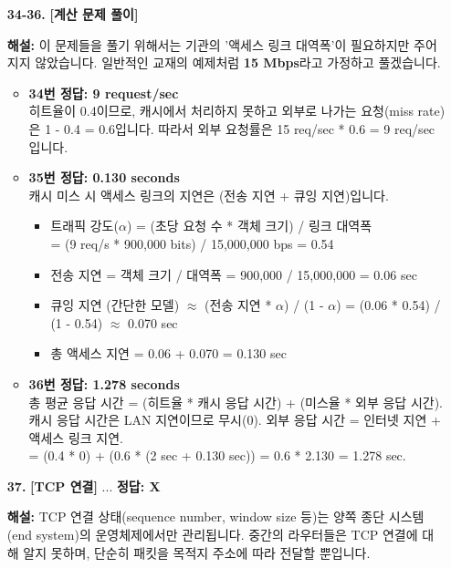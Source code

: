 \documentclass[a4paper, 10pt]{article}
\newcommand{\sectionbox}[1]{
  \vspace{0.5em}
  \noindent\fbox{\textbf{#1}}
  \vspace{0.5em}
}
\begin{document}
\begin{enumerate}[itemsep=2.5em, leftmargin=2em, label={}]
\item[\textbf{34-36.}] \textbf{[계산 문제 풀이]} \par
\small\textbf{해설:} 이 문제들을 풀기 위해서는 기관의 '액세스 링크 대역폭'이 필요하지만 주어지지 않았습니다. 일반적인 교재의 예제처럼 \textbf{15 Mbps}라고 가정하고 풀겠습니다.
\begin{itemize}
    \item \textbf{34번 정답: 9 request/sec} \\ 히트율이 0.4이므로, 캐시에서 처리하지 못하고 외부로 나가는 요청(miss rate)은 1 - 0.4 = 0.6입니다. 따라서 외부 요청률은 15 req/sec * 0.6 = 9 req/sec 입니다.
    \item \textbf{35번 정답: 0.130 seconds} \\ 캐시 미스 시 액세스 링크의 지연은 (전송 지연 + 큐잉 지연)입니다.
    \begin{itemize}
        \item 트래픽 강도($\alpha$) = (초당 요청 수 * 객체 크기) / 링크 대역폭 \\ = (9 req/s * 900,000 bits) / 15,000,000 bps = 0.54
        \item 전송 지연 = 객체 크기 / 대역폭 = 900,000 / 15,000,000 = 0.06 sec
        \item 큐잉 지연 (간단한 모델) $\approx$ (전송 지연 * $\alpha$) / (1 - $\alpha$) = (0.06 * 0.54) / (1 - 0.54) $\approx$ 0.070 sec
        \item 총 액세스 지연 = 0.06 + 0.070 = 0.130 sec
    \end{itemize}
    \item \textbf{36번 정답: 1.278 seconds} \\ 총 평균 응답 시간 = (히트율 * 캐시 응답 시간) + (미스율 * 외부 응답 시간). 캐시 응답 시간은 LAN 지연이므로 무시(0). 외부 응답 시간 = 인터넷 지연 + 액세스 링크 지연.
    \\ = (0.4 * 0) + (0.6 * (2 sec + 0.130 sec)) = 0.6 * 2.130 = 1.278 sec.
\end{itemize}

\item[] \sectionbox{VI. 종합 및 비교}

\item[\textbf{37.}] \textbf{[TCP 연결]} ...
\vspace{0.5em}
\noindent\textbf{정답: X} \par
\small\textbf{해설:} TCP 연결 상태(sequence number, window size 등)는 양쪽 종단 시스템(end system)의 운영체제에서만 관리됩니다. 중간의 라우터들은 TCP 연결에 대해 알지 못하며, 단순히 패킷을 목적지 주소에 따라 전달할 뿐입니다.


\end{enumerate}
\end{document}
